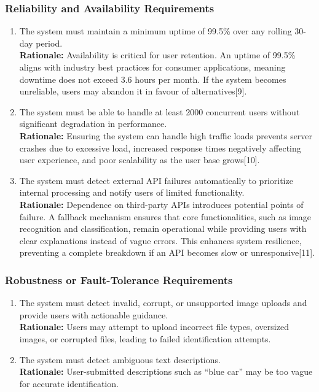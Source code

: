 \documentclass[]{article}
\begin{document}
\subsubsection{Reliability and Availability Requirements}
\label{ssub:reliability_and_availability_requirements}
\begin{enumerate}[label={PR-RA\arabic*.}]
    \item The system must maintain a minimum uptime of 99.5\% over any rolling 30-day period.\\
    \textbf{Rationale:} Availability is critical for user retention. An uptime of 99.5\% aligns with industry best practices for consumer applications, meaning downtime does not exceed 3.6 hours per month. If the system becomes unreliable, users may abandon it in favour of alternatives[9].
	\item The system must be able to handle at least 2000 concurrent users without significant degradation in performance.\\
	\textbf{Rationale:} Ensuring the system can handle high traffic loads prevents server crashes due to excessive load, increased response times negatively affecting user experience, and poor scalability as the user base grows[10].
	\item The system must detect external API failures automatically to prioritize internal processing and notify users of limited functionality.\\
	\textbf{Rationale:} Dependence on third-party APIs introduces potential points of failure. A fallback mechanism ensures that core functionalities, such as image recognition and classification, remain operational while providing users with clear explanations instead of vague errors. This enhances system resilience, preventing a complete breakdown if an API becomes slow or unresponsive[11].

\end{enumerate}

\subsubsection{Robustness or Fault-Tolerance Requirements}
\label{ssub:robustness_or_fault_tolerance_requirements}
\begin{enumerate}[label={PR-RFT\arabic*.}]
    \item The system must detect invalid, corrupt, or unsupported image uploads and provide users with actionable guidance.\\
	\textbf{Rationale:} Users may attempt to upload incorrect file types, oversized images, or corrupted files, leading to failed identification attempts.
	\item The system must detect ambiguous text descriptions.\\
	\textbf{Rationale:} User-submitted descriptions such as “blue car” may be too vague for accurate identification.
\end{enumerate}
\end{document}
